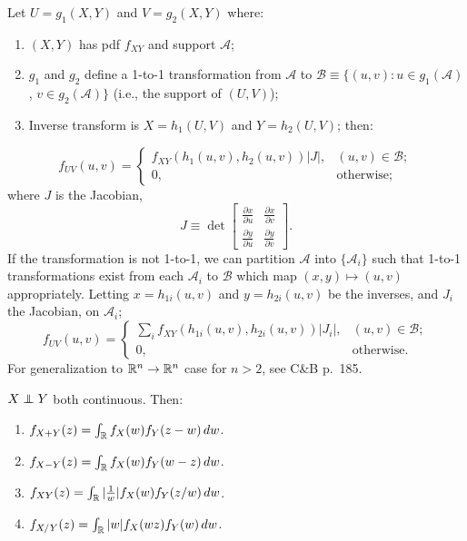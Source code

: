 \documentclass[8pt,letterpaper, landscape]{extarticle} %
\begin{document}
\begin{multicols}{3}
\begin{description}
 Let $ U = g_1 (X,Y) $ and $ V = g_2 (X,Y) $ where:
\begin{enumerate}
\item $ (X,Y) $ has pdf $ f_{XY} $ and support $ \mathcal{A} $;
\item $ g_1 $ and $ g_2 $ define a 1-to-1 transformation from $ \mathcal{A} $ to $ \mathcal{B} \equiv \{ (u,v) \colon u \in g_1(\mathcal{A}) $, $ v \in g_2(\mathcal{A}) \} $ (i.e., the support of $ (U,V) $);
\item Inverse transform is $ X = h_1 (U, V) $ and $ Y = h_2 (U, V) $; then:
\end{enumerate}
$$ f_{UV}(u, v) = \begin{cases}
f_{XY} (h_1(u, v), h_2(u, v)) \left| J \right| , & (u,v) \in \mathcal{B}; \\
0, & \text{otherwise;}
\end{cases} $$
where $ J $ is the Jacobian,
$$ J \equiv \operatorname{det} \begin{bmatrix}
\tfrac{\partial x}{\partial u} & \tfrac{\partial x}{\partial v} \\
\tfrac{\partial y}{\partial u} & \tfrac{\partial y}{\partial v}
\end{bmatrix} . $$
If the transformation is not 1-to-1, we can partition $ \mathcal{A} $ into $ \{ \mathcal{A}_i \} $ such that 1-to-1 transformations exist from each $ \mathcal{A}_i $ to $ \mathcal{B} $ which map $ (x,y) \mapsto (u,v) $ appropriately. Letting $ x = h_{1i} (u, v) $ and $ y = h_{2i} (u, v) $ be the inverses, and $ J_i $ the Jacobian, on $ \mathcal{A}_i $;
$$ f_{UV}(u, v) = \begin{cases}
\sum_i f_{XY} (h_{1i}(u, v), h_{2i}(u, v)) \left| J_i \right| , & (u,v) \in \mathcal{B}; \\
0, & \text{otherwise.}
\end{cases} $$
For generalization to $ \mathbb{R}^n \to \mathbb{R}^n $ case for $ n > 2 $, see C\&B p.~185.

 $ X \independent Y $ both continuous. Then:
\begin{enumerate}
\item $ f_{X+Y}(z) = \int_{\mathbb{R}} f_X(w) f_Y(z-w) \, dw $.
\item $ f_{X-Y}(z) = \int_{\mathbb{R}} f_X(w) f_Y(w-z) \, dw $.
\item $ f_{X Y}(z) = \int_{\mathbb{R}} | \tfrac{1}{w} | f_X(w) f_Y(z/w) \, dw $.
\item $ f_{X/Y}(z) = \int_{\mathbb{R}} | w | f_X(wz) f_Y(w) \, dw $.
\end{enumerate}


\end{description}
\end{multicols}
\end{document}
